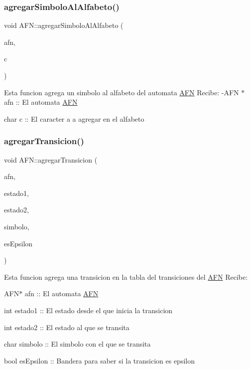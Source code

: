 \subsubsection{\texorpdfstring{agregar\+Simbolo\+Al\+Alfabeto()}{agregarSimboloAlAlfabeto()}}
{\footnotesize\ttfamily void A\+F\+N\+::agregar\+Simbolo\+Al\+Alfabeto (\begin{DoxyParamCaption}\item[{\hyperlink{class_a_f_n}{A\+FN} $\ast$}]{afn,  }\item[{char}]{c }\end{DoxyParamCaption})}

Esta funcion agrega un simbolo al alfabeto del automata \hyperlink{class_a_f_n}{A\+FN} Recibe\+: -\/\+A\+FN $\ast$ afn \+:\+: El automata \hyperlink{class_a_f_n}{A\+FN}
\begin{DoxyItemize}
\item char c \+:\+: El caracter a a agregar en el alfabeto 
\end{DoxyItemize}\mbox{\label{class_a_f_n_aaf3c4c74bdc3bc0bc31c1513773fbce2}} 
\subsubsection{\texorpdfstring{agregar\+Transicion()}{agregarTransicion()}}
{\footnotesize\ttfamily void A\+F\+N\+::agregar\+Transicion (\begin{DoxyParamCaption}\item[{\hyperlink{class_a_f_n}{A\+FN} $\ast$}]{afn,  }\item[{int}]{estado1,  }\item[{int}]{estado2,  }\item[{char}]{simbolo,  }\item[{bool}]{es\+Epsilon }\end{DoxyParamCaption})}

Esta funcion agrega una transicion en la tabla del transiciones del \hyperlink{class_a_f_n}{A\+FN} Recibe\+:
\begin{DoxyItemize}
\item A\+F\+N$\ast$ afn \+:\+: El automata \hyperlink{class_a_f_n}{A\+FN}
\end{DoxyItemize}

int estado1 \+:\+: El estado desde el que inicia la transicion
\begin{DoxyItemize}
\item int estado2 \+:\+: El estado al que se transita
\item char simbolo \+:\+: El simbolo con el que se transita
\item bool es\+Epsilon \+:\+: Bandera para saber si la transicion es epsilon 
\end{DoxyItemize}\mbox{\label{class_a_f_n_a67852dd0b85a91d9114df429592850ac}} 
